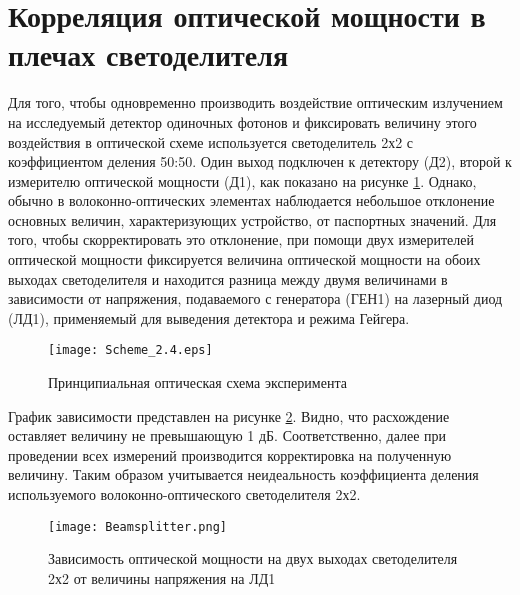 %
%


\section{Корреляция оптической мощности в плечах светоделителя} \label{sec:ch2/sec4}


Для того, чтобы одновременно производить воздействие оптическим излучением на исследуемый детектор одиночных фотонов и фиксировать величину этого воздействия в оптической схеме используется светоделитель 2х2 с коэффициентом деления 50:50. Один выход подключен к детектору (Д2), второй к измерителю оптической мощности (Д1), как показано на рисунке \ref{fig:Scheme_2.4}. Однако, обычно в волоконно-оптических элементах наблюдается небольшое отклонение основных величин, характеризующих устройство, от паспортных значений. Для того, чтобы скорректировать это отклонение, при помощи двух измерителей оптической мощности фиксируется величина оптической мощности на обоих выходах светоделителя и находится разница между двумя величинами в зависимости от напряжения, подаваемого с генератора (ГЕН1) на лазерный диод (ЛД1), применяемый для выведения детектора и режима Гейгера.   

 \begin{figure}[ht]
  \centering
  \texttt{[image: Scheme\_2.4.eps]}
  \caption{Принципиальная оптическая схема эксперимента}
  \label{fig:Scheme_2.4}
\end{figure}


График зависимости представлен на рисунке \ref{fig:Beamsplitter}. Видно, что расхождение оставляет величину не превышающую 1 дБ. Соответственно, далее при проведении всех измерений производится корректировка на полученную величину. Таким образом учитывается неидеальность коэффициента деления используемого волоконно-оптического светоделителя 2х2. 


 \begin{figure}[ht]
  \centering
  \texttt{[image: Beamsplitter.png]}
  \caption{Зависимость оптической мощности на двух выходах светоделителя 2х2 от величины напряжения на ЛД1}
  \label{fig:Beamsplitter}
\end{figure}
\pagebreak

